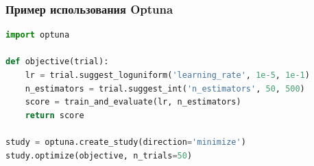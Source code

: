 \subsubsection{Пример использования Optuna}

\begin{lstlisting}[language=Python]
import optuna

def objective(trial):
    lr = trial.suggest_loguniform('learning_rate', 1e-5, 1e-1)
    n_estimators = trial.suggest_int('n_estimators', 50, 500)
    score = train_and_evaluate(lr, n_estimators)
    return score

study = optuna.create_study(direction='minimize')
study.optimize(objective, n_trials=50)
\end{lstlisting}


